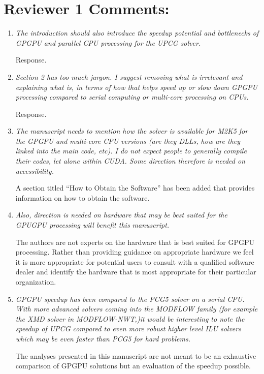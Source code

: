 \documentclass[12pt]{article} %
\begin{document}
\section*{Reviewer 1 Comments:}
\begin{enumerate}
\item \textit{The introduction should also introduce the speedup potential and bottlenecks of GPGPU and parallel CPU processing for the UPCG solver.} 

Response. 

\item \textit{Section 2 has too much jargon. I suggest removing what is irrelevant and explaining what is, in terms of how that helps speed up or slow down GPGPU processing compared to serial computing or multi-core processing on CPUs.} 

Response. 

\item \textit{The manuscript needs to mention how the solver is available for M2K5 for the GPGPU and multi-core CPU versions (are they DLLs, how are they linked into the main code, etc). I do not expect people to generally compile their codes, let alone within CUDA. Some direction therefore is needed on accessibility.} 

A section titled ``How to Obtain the Software'' has been added that provides information on how to obtain the software. 

\item \textit{Also, direction is needed on hardware that may be best suited for the GPUGPU processing will benefit this manuscript.} 

The authors are not experts on the hardware that is best suited for GPGPU processing. Rather than providing guidance on appropriate hardware we feel it is more appropriate for potential users to consult with a qualified software dealer and identify the hardware that is most appropriate for their particular organization.

\item \textit{GPGPU speedup has been compared to the PCG5 solver on a serial CPU. With more advanced solvers coming into the MODFLOW family (for example the XMD solver in MODFLOW-NWT,)it would be interesting to note the speedup of UPCG compared to even more robust higher level ILU solvers which may be even faster than PCG5 for hard problems.} 

The analyses presented in this manuscript are not meant to be an exhaustive comparison of GPGPU solutions but an evaluation of the speedup possible. 


\end{enumerate}
\end{document}
